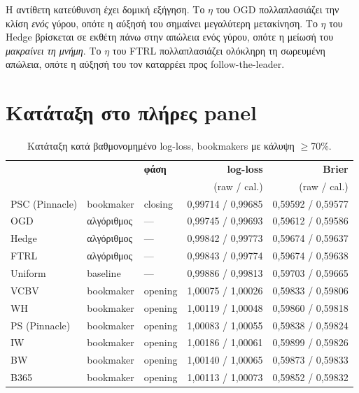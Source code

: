 \documentclass[12pt,a4paper,oneside]{report}
\renewcommand{\_}{\oldunderscore\allowbreak}
\theoremstyle{definition}
\theoremstyle{plain}
\theoremstyle{remark}
\begin{document}
Η αντίθετη κατεύθυνση έχει δομική εξήγηση. Το $\eta$ του OGD πολλαπλασιάζει την κλίση
\emph{ενός} γύρου, οπότε η αύξησή του σημαίνει μεγαλύτερη μετακίνηση. Το $\eta$ του Hedge
βρίσκεται σε εκθέτη πάνω στην απώλεια ενός γύρου, οπότε η μείωσή του \emph{μακραίνει τη
μνήμη}. Το $\eta$ του FTRL πολλαπλασιάζει ολόκληρη τη σωρευμένη απώλεια, οπότε η αύξησή του
τον καταρρέει προς follow-the-leader.

\section{Κατάταξη στο πλήρες panel}

\begin{table}[H]
\centering
\small
\begin{tabular}{@{}lllrr@{}}
\toprule
& & \textbf{φάση} & \textbf{log-loss} & \textbf{Brier} \\
& & & (raw / cal.) & (raw / cal.) \\
\midrule
PSC (Pinnacle) & bookmaker  & closing & 0,99714 / 0,99685 & 0,59592 / 0,59577 \\
OGD            & αλγόριθμος & ---     & 0,99745 / 0,99693 & 0,59612 / 0,59586 \\
Hedge          & αλγόριθμος & ---     & 0,99842 / 0,99773 & 0,59674 / 0,59637 \\
FTRL           & αλγόριθμος & ---     & 0,99843 / 0,99774 & 0,59674 / 0,59638 \\
Uniform        & baseline   & ---     & 0,99886 / 0,99813 & 0,59703 / 0,59665 \\
VC\_BV         & bookmaker  & opening & 1,00075 / 1,00026 & 0,59833 / 0,59806 \\
WH             & bookmaker  & opening & 1,00119 / 1,00048 & 0,59860 / 0,59818 \\
PS (Pinnacle)  & bookmaker  & opening & 1,00083 / 1,00055 & 0,59838 / 0,59824 \\
IW             & bookmaker  & opening & 1,00186 / 1,00061 & 0,59899 / 0,59826 \\
BW             & bookmaker  & opening & 1,00140 / 1,00065 & 0,59873 / 0,59833 \\
B365           & bookmaker  & opening & 1,00113 / 1,00073 & 0,59852 / 0,59832 \\
\bottomrule
\end{tabular}
\caption{Κατάταξη κατά βαθμονομημένο log-loss, bookmakers με κάλυψη $\geq$70\%.}
\label{tab:ranking}
\end{table}
\end{document}
